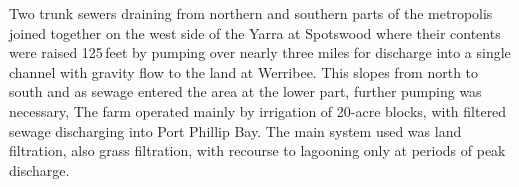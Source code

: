 Two trunk sewers draining from northern and southern parts of the
metro\-po\-lis joined together on the west side of the Yarra
 at Spotswood  
where their contents were raised 125\,feet by pumping over nearly
three miles for discharge into a single channel with gravity flow to
the land at Werribee.  This slopes from north to south and as sewage
entered the area at the lower part, further pumping was necessary, The
farm operated mainly by irrigation of 20-acre blocks, with filtered
sewage discharging into Port Phillip Bay.  The main system used was
land filtration, also grass filtration, with recourse to lagooning
only at periods of peak discharge.


